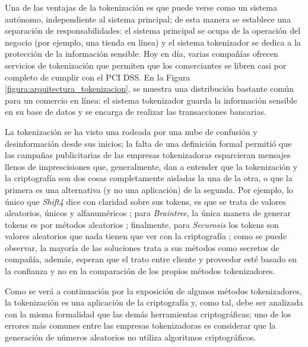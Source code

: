 Una de las ventajas de la tokenización es que puede verse como un sistema
autónomo, independiente al sistema principal; de esta manera se establece una
separación de responsabilidades: el sistema principal se ocupa de la operación
del negocio (por ejemplo, una tienda en línea) y el sistema tokenizador se
dedica a la protección de la información sensible. Hoy en día, varias compañías
ofrecen servicios de tokenización que permiten que los comerciantes se libren
casi por completo de cumplir con el PCI DSS. En la Figura
\ref{figura:arquitectura_tokenizacion}, se muestra una distribución bastante
común para un comercio en línea: el sistema tokenizador guarda la información
sensible en su base de datos y se encarga de realizar las transacciones
bancarias.


La tokenización se ha visto una rodeada por una nube de confusión y 
desinformación desde sus inicios; la falta de una definición formal permitió
que las campañas publicitarias de las empresas tokenizadoras esparcieran 
mensajes llenos de imprescisiones que, generalmente, dan a entender que la
tokenización y la criptografía son dos cosas completamente aisladas la una de la
otra, o que la primera es una alternativa (y no una aplicación) de la segunda.
Por ejemplo, lo único que \textit{Shift4} dice con claridad sobre sus tokens,
es que se trata de valores aleatorios, únicos y alfanuméricos \cite{shif4_uno}; 
para \textit{Braintree}, la única manera de generar tokens es por métodos
aleatorios \cite{braintree_uno}; finalmente, para \textit{Securosis} los tokens
son valores aleatorios que nada tienen que ver con la criptografía
\cite{securosis}; como se puede observar, la mayoría de las soluciones trata a
sus métodos como secretos de compañía, además, esperan que el trato entre
cliente y proveedor esté basado en la confianza y no en la comparación de los
propios métodos tokenizadores.


Como se verá a continuación por la exposición de algunos métodos tokenizadores,
la tokenización es una aplicación de la criptografía y, como tal, debe ser
analizada con la misma formalidad que las demás herramientas criptográficas; uno
de los errores más comunes entre las empresas tokenizadoras es considerar que 
la generación de números aleatorios no utiliza algoritmos criptográficos.

